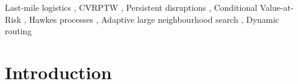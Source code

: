 \documentclass[preprint,12pt]{elsarticle}
\newcommand{\1}{\mathbf{1}}
\begin{document}
\begin{frontmatter}







\begin{keyword}
	Last-mile logistics \sep
	CVRPTW \sep
	Persistent disruptions \sep
	Conditional Value-at-Risk \sep
	Hawkes processes \sep
	Adaptive large neighbourhood search \sep
	Dynamic routing
\end{keyword}

\end{frontmatter}



\section{Introduction}
\end{document}
